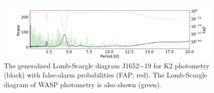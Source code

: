 \begin{figure}
    \centering
    \includegraphics[scale=0.4]{Appendix/Peridograms/J1652-19_period.png}
    \caption{The generalised Lomb-Scargle diagram J1652$-$19 for K2 photometry (black) with false-alarm probabilities (FAP; red). The Lomb-Scargle diagram of WASP photometry is also shown (green).  }
    \label{appendix:fig:J1652-19_lomb}
\end{figure}